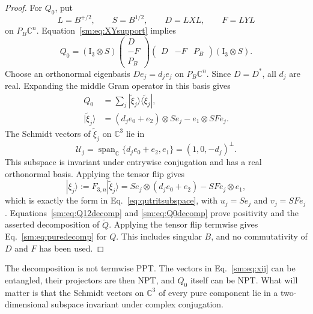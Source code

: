 \documentclass[aps,prl,reprint,superscriptaddress,nofootinbib]{revtex4-2}
\newcommand{\I}{\mathrm{I}}
\newcommand{\C}{\mathbb C}
\newcommand{\cU}{\mathcal U}
\begin{document}
\begin{proof}
For $Q_0$, put
\begin{equation}
 L=B^{+/2},\qquad S=B^{1/2},\qquad D=LXL,\qquad F=LYL
\label{sm:eq:LSD}
\end{equation}
on \(P_B\C^n\).  Equation~\eqref{sm:eq:XYsupport} implies
\begin{equation}
 Q_0=(\I_3\otimes S)
 \begin{pmatrix}D\\-F\\P_B\end{pmatrix}
 \begin{pmatrix}D&-F&P_B\end{pmatrix}
 (\I_3\otimes S).
\label{sm:eq:Q0filtered}
\end{equation}
Choose an orthonormal eigenbasis \(De_j=d_je_j\) on
\(P_B\C^n\).  Since \(D=D^*\), all \(d_j\) are real.  Expanding the
middle Gram operator in this basis gives
\begin{align}
 Q_0&=\sum_j|\widetilde\xi_j\rangle\langle\widetilde\xi_j|,
\label{sm:eq:Q0decomp}\\
 |\widetilde\xi_j\rangle&=(d_je_0+e_2)\otimes Se_j
 -e_1\otimes SFe_j.
\label{sm:eq:xij}
\end{align}
The Schmidt vectors of \(\widetilde\xi_j\) on $\C^3$ lie in
\begin{equation}
 \cU_j=\operatorname{span}_{\C}\{d_je_0+e_2,e_1\}
 =(1,0,-d_j)^\perp.
\label{sm:eq:qutritsubspace}
\end{equation}
This subspace is invariant under entrywise conjugation and has a real
orthonormal basis.  Applying the tensor flip gives
\begin{equation*}
 |\xi_j\rangle:=F_{3,n}|\widetilde\xi_j\rangle
 =Se_j\otimes(d_je_0+e_2)-SFe_j\otimes e_1,
\end{equation*}
which is exactly the form in Eq.~\eqref{eq:qutritsubspace}, with
\(u_j=Se_j\) and \(v_j=SFe_j\).
Equations~\eqref{sm:eq:Q12decomp} and
\eqref{sm:eq:Q0decomp} prove positivity and the asserted decomposition of
\(\widetilde Q\).  Applying the tensor flip termwise gives
Eq.~\eqref{sm:eq:puredecomp} for \(Q\).  This
includes singular \(B\), and no commutativity of \(D\) and \(F\) has been
used.
\end{proof}

The decomposition is not termwise PPT.  The vectors in
Eq.~\eqref{sm:eq:xij} can be entangled, their projectors are then
NPT, and \(Q_0\) itself can be NPT.  What will matter is that the Schmidt
vectors on $\C^3$ of every pure component lie in a two-dimensional subspace
invariant under complex conjugation.
\end{document}
